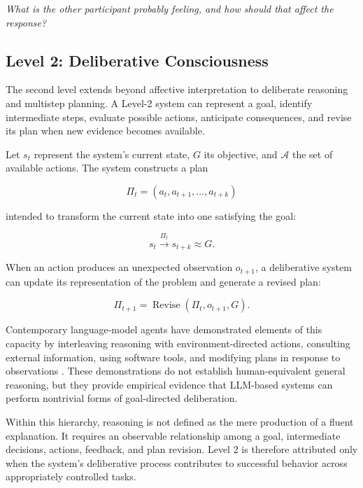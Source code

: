 \textit{What is the other participant probably feeling, and how should that affect the response?}

\subsection{Level 2: Deliberative Consciousness}

The second level extends beyond affective interpretation to deliberate reasoning and multistep planning. A Level-2 system can represent a goal, identify intermediate steps, evaluate possible actions, anticipate consequences, and revise its plan when new evidence becomes available.

Let \(s_t\) represent the system’s current state, \(G\) its objective, and \(\mathcal{A}\) the set of available actions. The system constructs a plan

\begin{equation}\label{eq5}
\Pi_t=(a_t,a_{t+1},\ldots,a_{t+k})
\end{equation}

intended to transform the current state into one satisfying the goal:

\begin{equation}\label{eq6}
s_t
\xrightarrow{\Pi_t}
s_{t+k}
\approx G.
\end{equation}

When an action produces an unexpected observation \(o_{t+1}\), a deliberative system can update its representation of the problem and generate a revised plan:

\begin{equation}\label{eq7}
\Pi_{t+1}
=
\operatorname{Revise}
\left(
\Pi_t,o_{t+1},G
\right).
\end{equation}

Contemporary language-model agents have demonstrated elements of this capacity by interleaving reasoning with environment-directed actions, consulting external information, using software tools, and modifying plans in response to observations \cite{yao2023react}. These demonstrations do not establish human-equivalent general reasoning, but they provide empirical evidence that LLM-based systems can perform nontrivial forms of goal-directed deliberation.

Within this hierarchy, reasoning is not defined as the mere production of a fluent explanation. It requires an observable relationship among a goal, intermediate decisions, actions, feedback, and plan revision. Level 2 is therefore attributed only when the system’s deliberative process contributes to successful behavior across appropriately controlled tasks.

